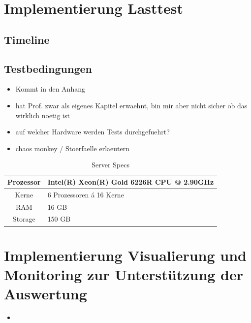 \section{Implementierung Lasttest}
\subsection{Timeline}
\subsection{Testbedingungen}
\begin{itemize}
  \item Kommt in den Anhang
  \item hat Prof. zwar als eigenes Kapitel erwaehnt, bin mir aber nicht sicher ob das wirklich noetig ist
  \item auf welcher Hardware werden Tests durchgefuehrt?
  \item chaos monkey / Stoerfaelle erlaeutern
\end{itemize}

\begin{table}
  \centering
  \caption{Server Specs}
  \bigskip
  \begin{tabular}{ c l }
    \toprule
    Prozessor & Intel(R) Xeon(R) Gold 6226R CPU @ 2.90GHz \\
    \midrule
    Kerne & 6 Prozessoren á 16 Kerne \\
    \midrule
    RAM & 16 GB \\
    \midrule
    Storage & 150 GB \\
    \bottomrule
  \end{tabular}
\end{table}


\section{Implementierung Visualierung und Monitoring zur Unterst\"utzung der Auswertung}






\begin{itemize}
  \item 
\end{itemize}